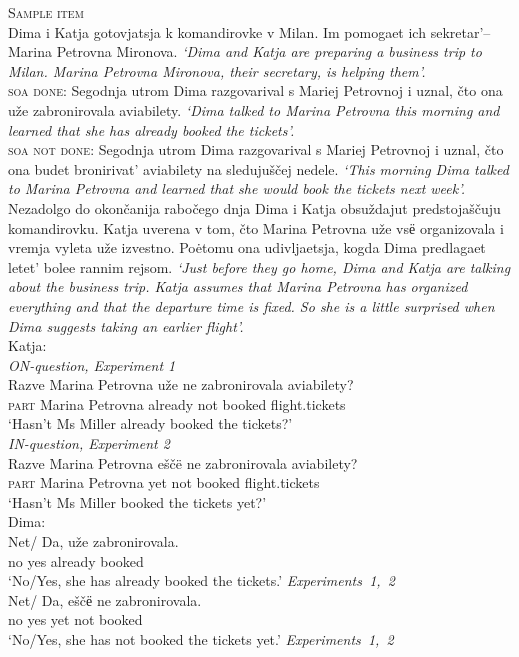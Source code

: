 \documentclass[output=paper,colorlinks,citecolor=brown]{langscibook}
\begin{document}
\eanoraggedright\label{geit-repp:ex:sample-item}
\textsc{Sample item}\\
Dima i Katja gotovjatsja k komandirovke v Milan. Im pomogaet ich sekretar’– Marina Petrovna Mironova. \textit{‘Dima and Katja are preparing a business trip to Milan. Marina Petrovna Mironova, their secretary, is helping them’.}\\
[12pt]
\textsc{soa done}: Segodnja utrom Dima razgovarival s Mariej Petrovnoj i uznal, čto ona uže zabronirovala aviabilety. \textit{‘Dima talked to Marina Petrovna this morning and learned that she has already booked the tickets’.}\\
[6pt]
\textsc{soa not done}: Segodnja utrom Dima razgovarival s Mariej Petrovnoj i uznal, čto ona budet bronirivat’ aviabilety na sledujuščej nedele. \textit{‘This morning Dima talked to Marina Petrovna and learned that she would book the tickets next week’.}\\
[12pt]	
Nezadolgo do okončanija rabočego dnja Dima i Katja obsuždajut predstojaščuju komandirovku. Katja uverena v tom, čto Marina Petrovna uže vsё organizovala i vremja vyleta uže izvestno. Poėtomu ona udivljaetsja, kogda Dima predlagaet letet’ bolee rannim rejsom. \textit{‘Just before they go home, Dima and Katja are talking about the business trip. Katja assumes that Marina Petrovna has organized everything and that the departure time is fixed. So she is a little surprised when Dima suggests taking an earlier flight’.}\\[12pt]
Katja:\\
\mbox{}\hfill \textit{ON-question, Experiment 1}\\ 
\gll Razve	Marina	Petrovna	uže 	ne	zabronirovala	aviabilety? \\
\textsc{part}	Marina	Petrovna	already	not	booked	flight.tickets\\ 
\glt ‘Hasn't Ms Miller already booked the tickets?’\\
\pagebreak
\mbox{}\hfill \textit{IN-question, Experiment 2}\\
\gll Razve	Marina	Petrovna	eščë 	ne	zabronirovala	aviabilety?\\ 
\textsc{part}	Marina	Petrovna	yet	not	booked	flight.tickets\\ 
\glt ‘Hasn't Ms Miller booked the tickets yet?’ \\
\vspace{12pt}
Dima:\\ 
\vspace{6pt}
\gll Net/ Da, uže zabronirovala.\\
no yes already booked\\
\glt ‘No/Yes, she has already booked the tickets.’ \hfill \textit{Experiments~1,~2}\\
\vspace{6pt}
\gll Net/ Da, eščё ne zabronirovala.\\
no yes yet not booked\\
\glt ‘No/Yes, she has not booked the tickets yet.’ \hfill \textit{Experiments~1,~2}\\
\z
\end{document}
